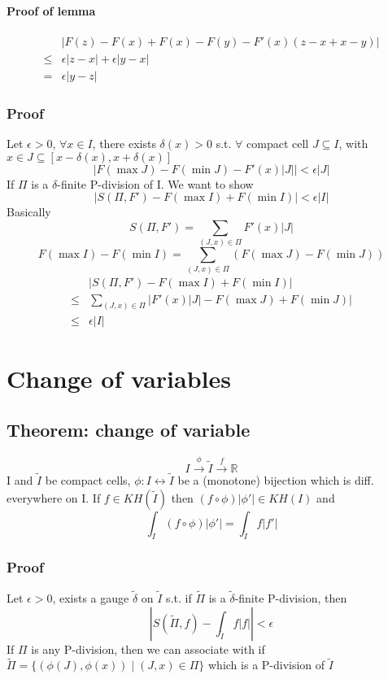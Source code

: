 \documentclass{book}
\newcommand{\abs}[1]{\left\lvert #1 \right\rvert}
\begin{document}
\subsubsection*{Proof of lemma}$$\begin{aligned}
    &\abs{F(z)-F(x)+F(x)-F(y)-F'(x)(z-x+x-y)}\\\leq& \epsilon\abs{z-x}+\epsilon\abs{y-x}\\ =&\epsilon\abs{y-z}
\end{aligned}
$$
\subsection*{Proof}
Let $\epsilon>0$, $\forall x\in I$, there exists $\delta(x)>0$ s.t. $\forall$ compact cell $J\subseteq I$, with $x\in J\subseteq[x-\delta(x),x+\delta(x)]$
$$\abs{F(\max J)-F(\min J)-F'(x)\abs J}<\epsilon\abs J$$
If $\Pi$ is a $\delta$-finite P-division of I. We want to show $$\abs{S(\Pi,F')-F(\max I)+F(\min I)}<\epsilon\abs I$$
Basically$$S(\Pi,F')=\sum\limits_{(J,x)\in \Pi}F'(x)\abs J$$
$$F(\max I)-F(\min I)=\sum\limits_{(J,x)\in \Pi}\left(F(\max J)-F(\min J)\right)$$
$$\begin{aligned}
    &\abs{S(\Pi,F')-F(\max I)+F(\min I)}\\
    \leq &\sum\limits_{(J,x)\in \Pi}\abs{F'(x)\abs J-F(\max J)+F(\min J)}\\
    \leq &\epsilon\abs I
\end{aligned}$$
\chapter{Change of variables}
\section{Theorem: change of variable}
$$I\stackrel{\phi}{\longrightarrow}\tilde I\stackrel{f}\longrightarrow\mathbb R$$
I and $\tilde I$ be compact cells, $\phi:I\leftrightarrow \tilde I$ be a (monotone) bijection which is diff. everywhere on I. If $f\in KH(\tilde I)$ then $(f\circ\phi)\abs{\phi'}\in KH(I)$ and $$\int_I(f\circ\phi)\abs{\phi'}=\int_{\tilde I}f\abs{f'}$$
\subsection*{Proof}
Let $\epsilon>0$, exists a gauge $\tilde\delta$ on $\tilde I$ s.t. if $\tilde\Pi$ is a $\tilde\delta$-finite P-division, then $$\abs{S(\tilde\Pi,f)-\int_{\tilde I}f\abs{f}}<\epsilon$$
If $\Pi$ is any P-division, then we can associate with if $\tilde\Pi=\{(\phi(J),\phi(x))\mid(J,x)\in \Pi\}$ which is a P-division of $\tilde I$
\end{document}
